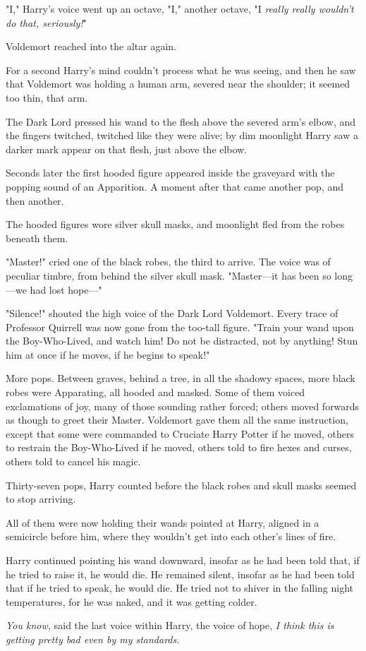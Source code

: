 "I," Harry's voice went up an octave, "I," another octave, "I \emph{really
really wouldn't do that, seriously!}"

 Voldemort reached
into the altar again.

For a second Harry's mind couldn't process what he was seeing, and then he saw
that Voldemort was holding a human arm, severed near the shoulder; it seemed
too thin, that arm.

The Dark Lord pressed his wand to the flesh above the severed arm's elbow, and
the fingers twitched, twitched like they were alive; by dim moonlight Harry saw
a darker mark appear on that flesh, just above the elbow.

Seconds later the first hooded figure appeared inside the graveyard with the
popping sound of an Apparition. A moment after that came another pop, and then
another.

The hooded figures wore silver skull masks, and moonlight fled from the robes
beneath them.

"Master!" cried one of the black robes, the third to arrive. The voice was of
peculiar timbre, from behind the silver skull mask. "Master---it has been so
long---we had lost hope\mbox{---}"

"Silence!" shouted the high voice of the Dark Lord Voldemort. Every trace of
Professor Quirrell was now gone from the too-tall figure. "Train your wand upon
the Boy-Who-Lived, and watch him! Do not be distracted, not by anything! Stun
him at once if he moves, if he begins to speak!"

More pops. Between graves, behind a tree, in all the shadowy spaces, more black
robes were Apparating, all hooded and masked. Some of them voiced exclamations
of joy, many of those sounding rather forced; others moved forwards as though
to greet their Master. Voldemort gave them all the same instruction, except
that some were commanded to Cruciate Harry Potter if he moved, others to
restrain the Boy-Who-Lived if he moved, others told to fire hexes and curses,
others told to cancel his magic.

Thirty-seven pops, Harry counted before the black robes and skull masks seemed
to stop arriving.

All of them were now holding their wands pointed at Harry, aligned in a
semicircle before him, where they wouldn't get into each other's lines of fire.

Harry continued pointing his wand downward, insofar as he had been told that,
if he tried to raise it, he would die. He remained silent, insofar as he had
been told that if he tried to speak, he would die. He tried not to shiver in
the falling night temperatures, for he was naked, and it was getting colder.

\emph{You know,} said the last voice within Harry, the voice of hope, \emph{I
think this is getting pretty bad even by my standards.}
